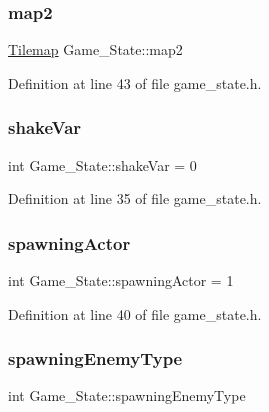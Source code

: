 \subsubsection{\texorpdfstring{map2}{map2}}
{\footnotesize\ttfamily \hyperlink{class_tilemap}{Tilemap} Game\+\_\+\+State\+::map2\hspace{0.3cm}{\ttfamily [protected]}}



Definition at line 43 of file game\+\_\+state.\+h.

\hypertarget{class_game___state_a6aef3b71ebbfc46aabe99005ad609c96}{}\label{class_game___state_a6aef3b71ebbfc46aabe99005ad609c96} 
\subsubsection{\texorpdfstring{shake\+Var}{shakeVar}}
{\footnotesize\ttfamily int Game\+\_\+\+State\+::shake\+Var = 0\hspace{0.3cm}{\ttfamily [protected]}}



Definition at line 35 of file game\+\_\+state.\+h.

\hypertarget{class_game___state_aea29b5ae20f29dea3ba382e0f406319e}{}\label{class_game___state_aea29b5ae20f29dea3ba382e0f406319e} 
\subsubsection{\texorpdfstring{spawning\+Actor}{spawningActor}}
{\footnotesize\ttfamily int Game\+\_\+\+State\+::spawning\+Actor = 1\hspace{0.3cm}{\ttfamily [protected]}}



Definition at line 40 of file game\+\_\+state.\+h.

\hypertarget{class_game___state_ab3f5efd3966eb17cff370700a750e1de}{}\label{class_game___state_ab3f5efd3966eb17cff370700a750e1de} 
\subsubsection{\texorpdfstring{spawning\+Enemy\+Type}{spawningEnemyType}}
{\footnotesize\ttfamily int Game\+\_\+\+State\+::spawning\+Enemy\+Type\hspace{0.3cm}{\ttfamily [protected]}}



